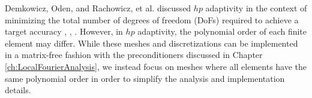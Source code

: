 Demkowicz, Oden, and Rachowicz, et al. discussed $hp$ adaptivity in the context of minimizing the total number of degrees of freedom (DoFs) required to achieve a target accuracy \cite{demkowicz1989toward}, \cite{oden1989toward}, \cite{rachowicz1989toward}.
However, in $hp$ adaptivity, the polynomial order of each finite element may differ.
While these meshes and discretizations can be implemented in a matrix-free fashion with the preconditioners discussed in Chapter \ref{ch:LocalFourierAnalysis}, we instead focus on meshes where all elements have the same polynomial order in order to simplify the analysis and implementation details.

